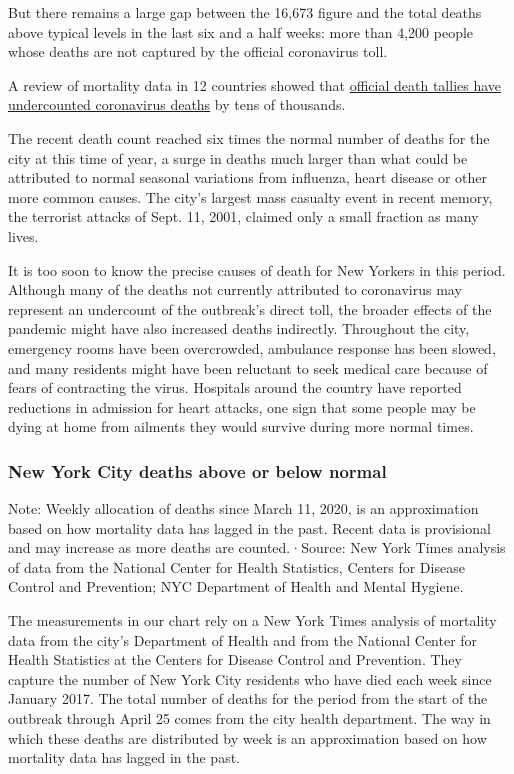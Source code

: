 But there remains a large gap between the 16,673 figure and the total
deaths above typical levels in the last six and a half weeks: more than
4,200 people whose deaths are not captured by the official coronavirus
toll.

A review of mortality data in 12 countries showed that
\href{https://www.nytimes3xbfgragh.onion/interactive/2020/04/21/world/coronavirus-missing-deaths.html}{official
death tallies have undercounted coronavirus deaths} by tens of
thousands.

The recent death count reached six times the normal number of deaths for
the city at this time of year, a surge in deaths much larger than what
could be attributed to normal seasonal variations from influenza, heart
disease or other more common causes. The city's largest mass casualty
event in recent memory, the terrorist attacks of Sept. 11, 2001, claimed
only a small fraction as many lives.

It is too soon to know the precise causes of death for New Yorkers in
this period. Although many of the deaths not currently attributed to
coronavirus may represent an undercount of the outbreak's direct toll,
the broader effects of the pandemic might have also increased deaths
indirectly. Throughout the city, emergency rooms have been overcrowded,
ambulance response has been slowed, and many residents might have been
reluctant to seek medical care because of fears of contracting the
virus. Hospitals around the country have reported reductions in
admission for heart attacks, one sign that some people may be dying at
home from ailments they would survive during more normal times.

\hypertarget{new-york-city-deaths-above-or-below-normal}{%
\subsubsection{\texorpdfstring{\textbf{New York City deaths} above or
below
normal}{New York City deaths above or below normal}}\label{new-york-city-deaths-above-or-below-normal}}

Note: Weekly allocation of deaths since March 11, 2020, is an
approximation based on how mortality data has lagged in the past. Recent
data is provisional and may increase as more deaths are counted.·Source:
New York Times analysis of data from the National Center for Health
Statistics, Centers for Disease Control and Prevention; NYC Department
of Health and Mental Hygiene.

The measurements in our chart rely on a New York Times analysis of
mortality data from the city's Department of Health and from the
National Center for Health Statistics at the Centers for Disease Control
and Prevention. They capture the number of New York City residents who
have died each week since January 2017. The total number of deaths for
the period from the start of the outbreak through April 25 comes from
the city health department. The way in which these deaths are
distributed by week is an approximation based on how mortality data has
lagged in the past.

